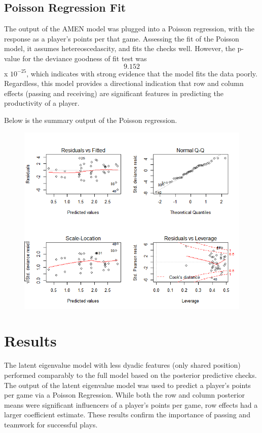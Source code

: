 \documentclass[12pt,twoside]{dukestatscithesis}
\theoremstyle{definition}
\theoremstyle{definition}
\theoremstyle{definition}
\theoremstyle{remark}
\begin{document}
\subsection{Poisson Regression Fit}\label{poisson-regression-fit}

The output of the AMEN model was plugged into a Poisson regression, with
the response as a player's points per that game. Assessing the fit of
the Poisson model, it assumes hetereoscedascity, and fits the checks
well. However, the p-value for the deviance goodness of fit test was
\[9.152\] x \(10^{-25}\), which indicates with strong evidence that the
model fits the data poorly. Regardless, this model provides a
directional indication that row and column effects (passing and
receiving) are significant features in predicting the productivity of a
player.

Below is the summary output of the Poisson regression.
\begin{figure}
\centering
\includegraphics{img/poissonsummary2.png}
\caption{}
\end{figure}
\section{Results}\label{results-1}

The latent eigenvalue model with less dyadic features (only shared
position) performed comparably to the full model based on the posterior
predictive checks. The output of the latent eigenvalue model was used to
predict a player's points per game via a Poisson Regression. While both
the row and column posterior means were significant influencers of a
player's points per game, row effects had a larger coefficient estimate.
These results confirm the importance of passing and teamwork for
successful plays.
\end{document}

